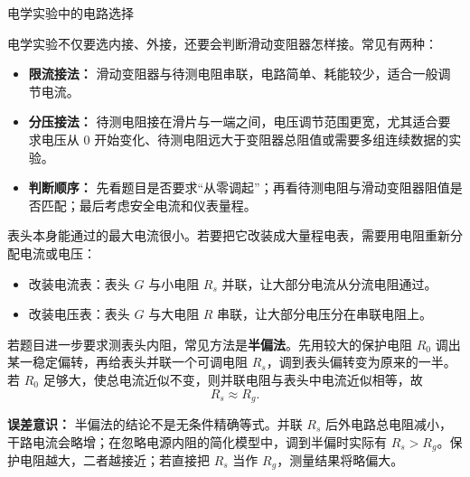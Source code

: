 \begin{conceptbox}{电学实验中的电路选择}

电学实验不仅要选内接、外接，还要会判断滑动变阻器怎样接。常见有两种：

\begin{center}


\label{fig:rheostat-limit-divider}
\end{center}

\begin{itemize}
  \item \textbf{限流接法：} 滑动变阻器与待测电阻串联，电路简单、耗能较少，适合一般调节电流。
  \item \textbf{分压接法：} 待测电阻接在滑片与一端之间，电压调节范围更宽，尤其适合要求电压从 $0$ 开始变化、待测电阻远大于变阻器总阻值或需要多组连续数据的实验。
  \item \textbf{判断顺序：} 先看题目是否要求“从零调起”；再看待测电阻与滑动变阻器阻值是否匹配；最后考虑安全电流和仪表量程。
\end{itemize}

表头本身能通过的最大电流很小。若要把它改装成大量程电表，需要用电阻重新分配电流或电压：

\begin{center}


\label{fig:meter-range-extension}
\end{center}

\begin{itemize}
  \item 改装电流表：表头 $G$ 与小电阻 $R_s$ 并联，让大部分电流从分流电阻通过。
  \item 改装电压表：表头 $G$ 与大电阻 $R$ 串联，让大部分电压分在串联电阻上。
\end{itemize}

若题目进一步要求测表头内阻，常见方法是\textbf{半偏法}。先用较大的保护电阻 $R_0$ 调出某一稳定偏转，再给表头并联一个可调电阻 $R_s$，调到表头偏转变为原来的一半。若 $R_0$ 足够大，使总电流近似不变，则并联电阻与表头中电流近似相等，故
\[
R_s \approx R_g.
\]

\begin{center}
\begin{minipage}{0.96\linewidth}
\centering


\label{fig:half-deflection-galvanometer}
\end{minipage}
\end{center}

\textbf{误差意识：} 半偏法的结论不是无条件精确等式。并联 $R_s$ 后外电路总电阻减小，干路电流会略增；在忽略电源内阻的简化模型中，调到半偏时实际有 $R_s>R_g$。保护电阻越大，二者越接近；若直接把 $R_s$ 当作 $R_g$，测量结果将略偏大。
\end{conceptbox}

